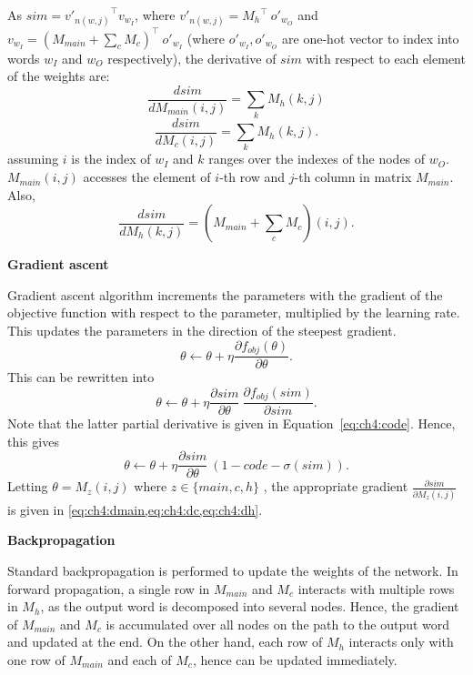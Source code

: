 \documentclass[a4paper,12pt,twoside,openright]{report}
\newcommand{\tb}{\vspace{10pt} \textbf}
\begin{document}
As $sim={v'_{n(w,j)}}^{\intercal} v_{w_I}$, where $v'_{n(w,j)}={M_h}^\intercal\:o'_{w_O}$ and $v_{w_I} = (M_{main}+\sum_{c}^{}{M_{c}})^\intercal\:o'_{w_I}$ (where $o'_{w_I}, o'_{w_O}$ are one-hot vector to index into words $w_I$ and $w_O$ respectively), the derivative of $sim$ with respect to each element of the weights are:
\begin{equation}
\frac{dsim}{dM_{main}(i,j)}=\sum_{k}^{}M_{h}(k,j)
\label{eq:ch4:dmain}
\end{equation}
\begin{equation}
\frac{dsim}{dM_{c}(i,j)}=\sum_{k}^{}M_{h}(k,j).
\label{eq:ch4:dc}
\end{equation} assuming $i$ is the index of $w_I$ and $k$ ranges over the indexes of the nodes of $w_O$. $M_{main}(i,j)$ accesses the element of $i$-th row and $j$-th column in matrix $M_{main}$. Also,
\begin{equation}
\frac{dsim}{dM_{h}(k,j)}=(M_{main}+\sum_{c}^{}{M_{c}})(i,j).
\label{eq:ch4:dh}
\end{equation}

\tb{Gradient ascent}

Gradient ascent algorithm increments the parameters with the gradient of the objective function with respect to the parameter, multiplied by the learning rate. This updates the parameters in the direction of the steepest gradient.
$$\theta \leftarrow \theta + \eta\frac{\partial f_{obj}(\theta)}{\partial\theta}.$$ This can be rewritten into 
$$\theta \leftarrow \theta + \eta\frac{\partial sim}{\partial\theta}\:\frac{\partial f_{obj}(sim)}{\partial sim}.$$
Note that the latter partial derivative is given in Equation~\ref{eq:ch4:code}. Hence, this gives
\begin{equation}
\theta \leftarrow \theta + \eta\frac{\partial sim}{\partial\theta}\:(1-code-\sigma(sim)).
\label{eq:ch4:grad}
\end{equation}
Letting $\theta=M_{z}(i,j)$ where $z \in \{main,c,h\}$ , the appropriate gradient $\frac{\partial sim}{\partial M_z(i,j)}$ is given in \cref{eq:ch4:dmain,eq:ch4:dc,eq:ch4:dh}.

\tb{Backpropagation}

Standard backpropagation is performed to update the weights of the network. In forward propagation, a single row in $M_{main}$ and $M_{c}$ interacts with multiple rows in $M_h$, as the output word is decomposed into several nodes. Hence, the gradient of $M_{main}$ and $M_c$ is accumulated over all nodes on the path to the output word and updated at the end. On the other hand, each row of $M_h$ interacts only with one row of $M_{main}$ and each of $M_c$, hence can be updated immediately.
\end{document}
